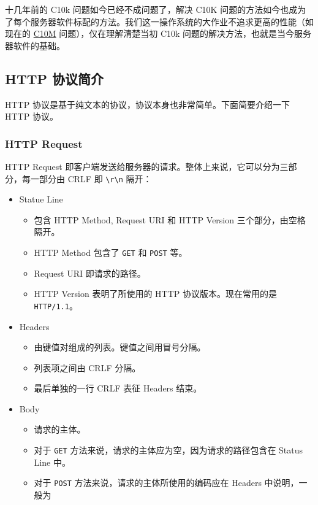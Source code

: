 \documentclass[a4paper]{article}
\providecommand{\tightlist}{\setlength{\itemsep}{0pt}\setlength{\parskip}{0pt}}
\begin{document}
十几年前的 C10k 问题如今已经不成问题了，解决 C10K 问题的方法如今也成为了每个服务器软件标配的方法。我们这一操作系统的大作业不追求更高的性能（如现在的 \href{http://c10m.robertgraham.com/p/manifesto.html}{C10M} 问题），仅在理解清楚当初 C10k 问题的解决方法，也就是当今服务器软件的基础。

\subsection{HTTP 协议简介}

HTTP 协议是基于纯文本的协议，协议本身也非常简单。下面简要介绍一下 HTTP 协议。

\subsubsection{HTTP Request}

HTTP Request 即客户端发送给服务器的请求。整体上来说，它可以分为三部分，每一部分由 CRLF 即 \texttt{\textbackslash{}r\textbackslash{}n} 隔开：

\begin{itemize}
\tightlist
\item
  Statue Line

  \begin{itemize}
  \tightlist
  \item
    包含 HTTP Method, Request URI 和 HTTP Version 三个部分，由空格隔开。
  \item
    HTTP Method 包含了 \texttt{GET} 和 \texttt{POST} 等。
  \item
    Request URI 即请求的路径。
  \item
    HTTP Version 表明了所使用的 HTTP 协议版本。现在常用的是 \texttt{HTTP/1.1}。
  \end{itemize}
\item
  Headers

  \begin{itemize}
  \tightlist
  \item
    由键值对组成的列表。键值之间用冒号分隔。
  \item
    列表项之间由 CRLF 分隔。
  \item
    最后单独的一行 CRLF 表征 Headers 结束。
  \end{itemize}
\item
  Body

  \begin{itemize}
  \tightlist
  \item
    请求的主体。
  \item
    对于 \texttt{GET} 方法来说，请求的主体应为空，因为请求的路径包含在 Status Line 中。
  \item
    对于 \texttt{POST} 方法来说，请求的主体所使用的编码应在 Headers 中说明，一般为 \\ 
  \end{itemize}
\end{itemize}
\end{document}
